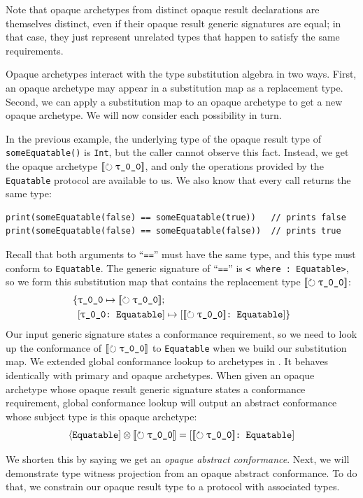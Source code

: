 \documentclass[../generics]{subfiles}
\begin{document}
Note that opaque archetypes from distinct opaque result declarations are themselves distinct, even if their opaque result generic signatures are equal; in that case, they just represent unrelated types that happen to satisfy the same requirements.

Opaque archetypes interact with the type substitution algebra in two ways. First, an opaque archetype may appear in a substitution map as a replacement type. Second, we can apply a substitution map to an opaque archetype to get a new opaque archetype. We will now consider each possibility in turn.
\begin{example}
In the previous example, the underlying type of the opaque result type of \texttt{someEquatable()} is \texttt{Int}, but the caller cannot observe this fact. Instead, we get the opaque archetype $\Ox$, and only the operations provided by the \texttt{Equatable} protocol are available to us. We also know that every call returns the same type:
\begin{Verbatim}
print(someEquatable(false) == someEquatable(true))   // prints false
print(someEquatable(false) == someEquatable(false))  // prints true
\end{Verbatim}
Recall that both arguments to ``\texttt{==}'' must have the same type, and this type must conform to \texttt{Equatable}. The generic signature of ``\texttt{==}'' is \texttt{<\rT\ where \rT:\ Equatable>}, so we form this substitution map that contains the replacement type $\Ox$:
\begin{align*}
\SubstMapC{&\SubstType{\rT}{$\Ox$}}{\\
&\SubstConf{\rT}{$\Ox$}{Equatable}}
\end{align*}
Our input generic signature states a conformance requirement, so we need to look up the conformance of $\Ox$ to \texttt{Equatable} when we build our substitution map. We extended global conformance lookup to archetypes in . It behaves identically with primary and opaque archetypes. When given an opaque archetype whose opaque result generic signature states a conformance requirement, global conformance lookup will output an abstract conformance whose subject type is this opaque archetype:
\[
\Proto{Equatable} \otimes \Ox = \ConfReq{$\Ox$}{Equatable}
\]
\end{example}

We shorten this by saying we get an \emph{opaque abstract conformance}. Next, we will demonstrate type witness projection from an opaque abstract conformance. To do that, we constrain our opaque result type to a protocol with associated types.
\end{document}
